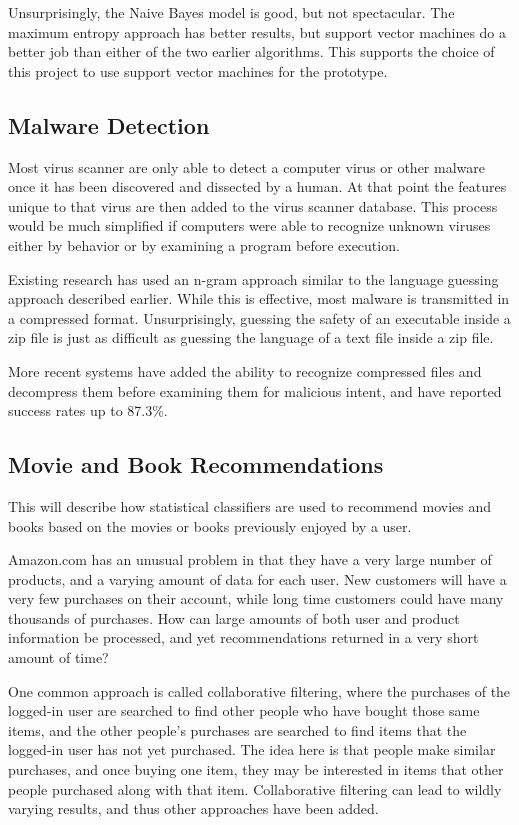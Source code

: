 \documentclass[12pt]{article}
\begin{document}
Unsurprisingly, the Naive Bayes model is good, but not spectacular. The maximum entropy approach has better
results, but support vector machines do a better job than either of the two earlier algorithms. This supports
the choice of this project to use support vector machines for the prototype.
\subsection{Malware Detection}
Most virus scanner are only able to detect a computer virus or other malware once it has been discovered and
dissected by a human. At that point the features unique to that virus are then added to the virus scanner
database.  This process would be much simplified if computers were able to recognize unknown viruses either by
behavior or by examining a program before execution.

Existing research has used an n-gram approach similar to the language guessing approach described
earlier. While this is effective, most malware is transmitted in a compressed format. Unsurprisingly, guessing
the safety of an executable inside a zip file is just as difficult as guessing the language of a text file
inside a zip file.

More recent systems have added the ability to recognize compressed files and decompress them before examining
them for malicious intent, and have reported success rates up to 87.3\%. \cite{perdisci2008mcboost}
\subsection{Movie and Book Recommendations}
This will describe how statistical classifiers are used to recommend movies \cite{basu1998recommendation} and
books \cite{linden2003amazon} based on the movies or books previously enjoyed by a user.

Amazon.com has an unusual problem in that they have a very large number of products, and a varying amount of
data for each user. New customers will have a very few purchases on their account, while long time customers
could have many thousands of purchases. How can large amounts of both user and product information be
processed, and yet recommendations returned in a very short amount of time?

One common approach is called collaborative filtering, where the purchases of the logged-in user are searched
to find other people who have bought those same items, and the other people's purchases are searched to find
items that the logged-in user has not yet purchased. The idea here is that people make similar purchases, and
once buying one item, they may be interested in items that other people purchased along with that item.
Collaborative filtering can lead to wildly varying results, and thus other approaches have been added.
\end{document}
